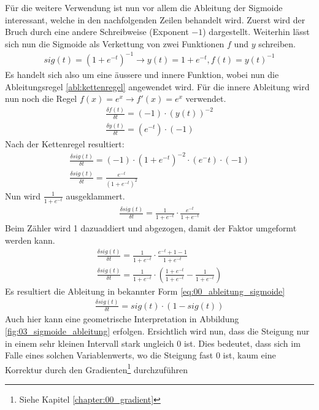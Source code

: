 Für die weitere Verwendung ist nun vor allem die Ableitung der Sigmoide interessant, welche in den nachfolgenden
Zeilen behandelt wird. Zuerst wird der Bruch durch eine andere Schreibweise (Exponent $-1$) dargestellt. Weiterhin
lässt sich nun die Sigmoide als Verkettung von zwei Funktionen $f$ und $y$ schreiben.
\begin{align}
    sig(t) = (1 + e^{-t})^{-1} \longrightarrow y(t) = 1 + e^{-t}, f(t) = y(t)^{-1}
\end{align}
Es handelt sich also um eine äussere und innere Funktion, wobei nun die Ableitungsregel \ref{abl:kettenregel} angewendet wird.
Für die innere Ableitung wird nun noch die Regel $f(x) = e^x \longrightarrow f'(x) = e^x$ verwendet.
\begin{align}
    \frac{\delta f(t)}{\delta t} = (-1) \cdot (y(t))^{-2}\\
    \frac{\delta y(t)}{\delta t} = (e^{-t}) \cdot (-1)
\end{align}
Nach der Kettenregel resultiert:
\begin{align}
    \frac{\delta sig(t)}{\delta t} = (-1) \cdot (1 + e^{-t})^{-2} \cdot (e^-t) \cdot (-1)\\
    \frac{\delta sig(t)}{\delta t} = \frac{e^{-t}}{(1 + e^{-t})^{2}}
\end{align}
Nun wird $\frac{1}{1 + e^{-t}}$ ausgeklammert.
\begin{align}
    \frac{\delta sig(t)}{\delta t} = \frac{1}{1 + e^{-t}} \cdot \frac{e^{-t}}{1 + e^{-t}}
\end{align}
Beim Zähler wird 1 dazuaddiert und abgezogen, damit der Faktor umgeformt werden kann.
\begin{align}
    \frac{\delta sig(t)}{\delta t} = \frac{1}{1 + e^{-t}} \cdot \frac{e^{-t} + 1 - 1}{1 + e^{-t}}\\
    \frac{\delta sig(t)}{\delta t} = \frac{1}{1 + e^{-t}} \cdot (\frac{1 + e^{-t}}{1 + e^{-t}} - \frac{1}{1 + e^{-t}})
\end{align}
Es resultiert die Ableitung in bekannter Form \ref{eq:00_ableitung_sigmoide}
\begin{align}
    \frac{\delta sig(t)}{\delta t} = sig(t) \cdot (1 - sig(t))\label{eq:00_ableitung_sigmoide}
\end{align}
Auch hier kann eine geometrische Interpretation in Abbildung \ref{fig:03_sigmoide_ableitung} erfolgen. Ersichtlich
wird nun, dass die Steigung nur in einem sehr kleinen Intervall stark ungleich $0$ ist. Dies bedeutet, dass sich im
Falle eines solchen Variablenwerts, wo die Steigung fast $0$ ist, kaum eine Korrektur durch den Gradienten\footnote{Siehe Kapitel \ref{chapter:00_gradient}} durchzuführen
